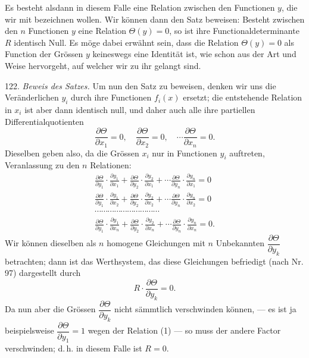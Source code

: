 
Es besteht alsdann in diesem Falle eine Relation zwischen den Functionen $y$, die wir mit
bezeichnen wollen. Wir können dann den Satz beweisen: \glqq Besteht zwischen den $n$ Functionen $y$ eine Relation $\Theta(y) = 0$, so ist ihre Functionaldeterminante $R$ identisch Null.\grqq{} Es möge dabei erwähnt sein, dass die Relation $\Theta(y) = 0$ als Function der Grössen $y$ keineswegs eine Identität ist, wie schon aus der Art und Weise hervorgeht, auf welcher wir zu ihr gelangt sind.

122. \textit{Beweis des Satzes.} Um nun den Satz zu beweisen, denken wir uns die Veränderlichen $y_i$ durch ihre Functionen $f_i(x)$ ersetzt; die entstehende Relation in $x_i$ ist aber dann identisch null, und daher auch alle ihre partiellen Differentialquotienten
\[
\frac{\partial \Theta}{\partial x_1} = 0, \quad \frac{\partial \Theta}{\partial x_2} = 0, \quad \cdots \frac{\partial \Theta}{\partial x_n} = 0.
\]
Dieselben geben also, da die Grössen $x_i$ nur in Functionen $y_i$ auftreten, Veranlassung zu den $n$ Relationen:
\begin{gather*}
\frac{\partial \Theta}{\partial y_1} \cdot \frac{\partial y_1}{\partial x_1} + \frac{\partial \Theta}{\partial y_2} \cdot \frac{\partial y_2}{\partial x_1} + \cdots \frac{\partial \Theta}{\partial y_n} \cdot \frac{\partial y_n}{\partial x_1} = 0 \\
\frac{\partial \Theta}{\partial y_1} \cdot \frac{\partial y_1}{\partial x_2} + \frac{\partial \Theta}{\partial y_2} \cdot \frac{\partial y_2}{\partial x_2} + \cdots \frac{\partial \Theta}{\partial y_n} \cdot \frac{\partial y_n}{\partial x_2} = 0 \\
\cdots\cdots\cdots\cdots\cdots\cdots\cdots\cdots\cdots\cdots \\
\frac{\partial \Theta}{\partial y_1} \cdot \frac{\partial y_1}{\partial x_n} + \frac{\partial \Theta}{\partial y_2} \cdot \frac{\partial y_2}{\partial x_n} + \cdots \frac{\partial \Theta}{\partial y_n} \cdot \frac{\partial y_n}{\partial x_n} = 0.
\end{gather*}
Wir können dieselben als $n$ homogene Gleichungen mit $n$ Unbekannten $\dfrac{\partial \Theta}{\partial y_k}$ betrachten; dann ist das Werthsystem, das diese Gleichungen befriedigt (nach Nr. 97) dargestellt durch
\[
R \cdot \frac{\partial \Theta}{\partial y_k} = 0.
\]
Da nun aber die Grössen $\dfrac{\partial \Theta}{\partial y_k}$ nicht sämmtlich verschwinden können, — es ist ja beispielsweise $\dfrac{\partial \Theta}{\partial y_1} = 1$ wegen der Relation (1) — so muss der andere Factor verschwinden; d.\,h. in diesem Falle ist $R = 0$.

